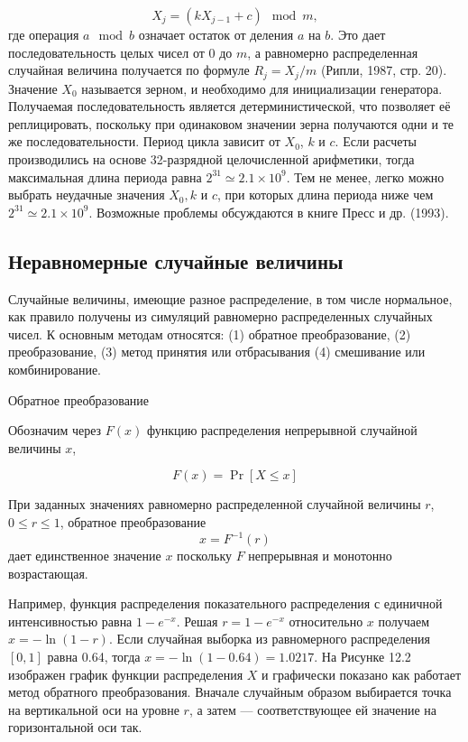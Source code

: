 \[
X_j=(kX_{j-1}+c) \mod{m},
\]
где операция $a \mod b$ означает остаток от деления $a$ на $b$. Это дает последовательность целых чисел от $0$ до $m$, а равномерно распределенная случайная величина получается по формуле $R_j=X_j/m$ (Рипли, 1987,  стр. 20). Значение $X_0$ называется зерном, и необходимо для инициализации генератора.  Получаемая  последовательность является детерминистической, что позволяет её реплицировать, поскольку при одинаковом  значении зерна получаются одни и те же последовательности. Период цикла зависит от $X_0$, $k$ и $c$. Если расчеты производились на основе 32-разрядной целочисленной арифметики, тогда максимальная длина периода равна $2^{31} \simeq 2.1\times 10^9$. Тем не менее, легко можно выбрать неудачные  значения $X_0,k$ и $c$, при которых длина периода ниже чем $2^{31} \simeq 2.1\times 10^9$. Возможные проблемы обсуждаются в книге Пресс и др. (1993). 

\subsection{Неравномерные случайные величины}

Случайные величины, имеющие разное распределение, в том числе нормальное, как правило получены из симуляций равномерно распределенных случайных чисел. К основным методам относятся: (1) обратное преобразование, (2) преобразование, (3) метод принятия или отбрасывания (4) смешивание или комбинирование.

\begin{center}
Обратное преобразование
\end{center}

Обозначим через $F(x)$ функцию распределения непрерывной случайной величины $x$,

\[
F(x)=\Pr[X\leq x]
\]

При заданных значениях равномерно распределенной случайной величины $r$, $0 \leq r \leq 1$, обратное преобразование
\[
x=F^{-1}(r)
\]
дает единственное значение $x$ поскольку $F$ непрерывная и монотонно возрастающая.

Например, функция распределения показательного распределения с единичной интенсивностью равна $1-e^{-x}$. Решая $r=1-e^{-x}$ относительно $x$  получаем $x=-\ln{(1-r)}$. Если случайная выборка из равномерного распределения $[0,1]$ равна 0.64, тогда $x=-\ln{(1-0.64)}=1.0217$. На Рисунке 12.2 изображен график функции распределения $X$ и графически показано как работает метод обратного преобразования. Вначале случайным образом выбирается точка на вертикальной оси на уровне $r$, а затем --- соответствующее ей  значение на горизонтальной оси так.  

